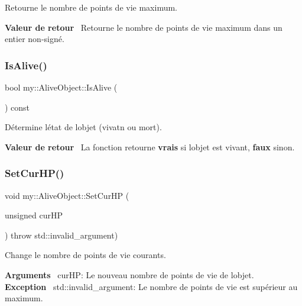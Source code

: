 Retourne le nombre de points de vie maximum. 

{\bfseries Valeur de retour}~\newline
 Retourne le nombre de points de vie maximum dans un entier non-\/signé. \mbox{\label{classmy_1_1AliveObject_ae3d7fb84f66db19cd49e238405590d40}} 
\subsubsection{\texorpdfstring{Is\+Alive()}{IsAlive()}}
{\footnotesize\ttfamily bool my\+::\+Alive\+Object\+::\+Is\+Alive (\begin{DoxyParamCaption}{ }\end{DoxyParamCaption}) const\hspace{0.3cm}{\ttfamily [noexcept]}}



Détermine l\textquotesingle{}état de l\textquotesingle{}objet (vivatn ou mort). 

{\bfseries Valeur de retour}~\newline
 La fonction retourne {\bfseries vrais} si l\textquotesingle{}objet est vivant, {\bfseries faux} sinon. \mbox{\label{classmy_1_1AliveObject_ae3cf3e26f9fc6b497d8b659621d3ffa8}} 
\subsubsection{\texorpdfstring{Set\+Cur\+H\+P()}{SetCurHP()}}
{\footnotesize\ttfamily void my\+::\+Alive\+Object\+::\+Set\+Cur\+HP (\begin{DoxyParamCaption}\item[{unsigned}]{cur\+HP }\end{DoxyParamCaption}) throw  std\+::invalid\+\_\+argument) }



Change le nombre de points de vie courants. 

{\bfseries Arguments}~\newline
 cur\+HP\+: Le nouveau nombre de points de vie de l\textquotesingle{}objet. ~\newline
~\newline
 {\bfseries Exception}~\newline
 std\+::invalid\+\_\+argument\+: Le nombre de points de vie est supérieur au maximum. \mbox{\label{classmy_1_1AliveObject_aea104f1424ccb0e2ebca84bd0fba3029}} 
